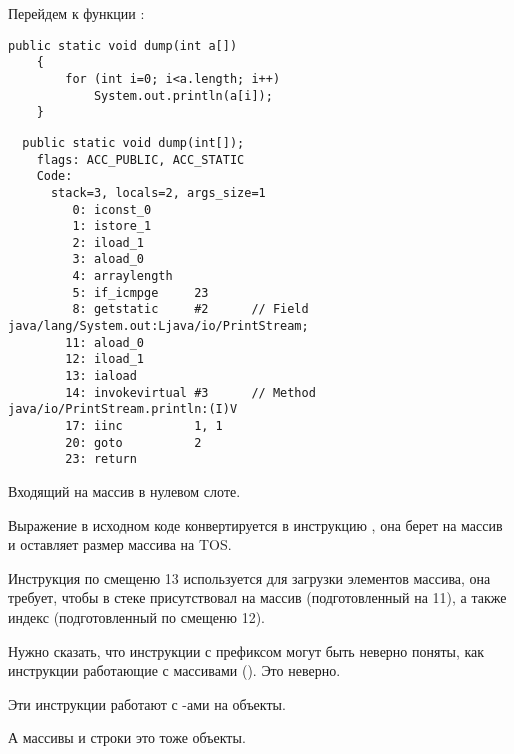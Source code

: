 Перейдем к функции :

\begin{lstlisting}[style=customjava]
	public static void dump(int a[])
	{
		for (int i=0; i<a.length; i++)
			System.out.println(a[i]);
	}
\end{lstlisting}

\begin{lstlisting}
  public static void dump(int[]);
    flags: ACC_PUBLIC, ACC_STATIC
    Code:
      stack=3, locals=2, args_size=1
         0: iconst_0      
         1: istore_1      
         2: iload_1       
         3: aload_0       
         4: arraylength   
         5: if_icmpge     23
         8: getstatic     #2      // Field java/lang/System.out:Ljava/io/PrintStream;
        11: aload_0       
        12: iload_1       
        13: iaload        
        14: invokevirtual #3      // Method java/io/PrintStream.println:(I)V
        17: iinc          1, 1
        20: goto          2
        23: return        
\end{lstlisting}

Входящий  на массив в нулевом слоте.

Выражение  в исходном коде конвертируется в инструкцию ,
она берет  на массив и оставляет размер массива на \ac{TOS}.

Инструкция  по смещеню 13 используется для загрузки элементов массива, 
она требует, чтобы в стеке присутствовал  на массив
(подготовленный  на 11), 
а также индекс (подготовленный  по смещеню 12).

Нужно сказать, что инструкции с префиксом  могут быть неверно поняты, 
как инструкции работающие с массивами ().
Это неверно.

Эти инструкции работают с -ами на объекты.

А массивы и строки это тоже объекты.
